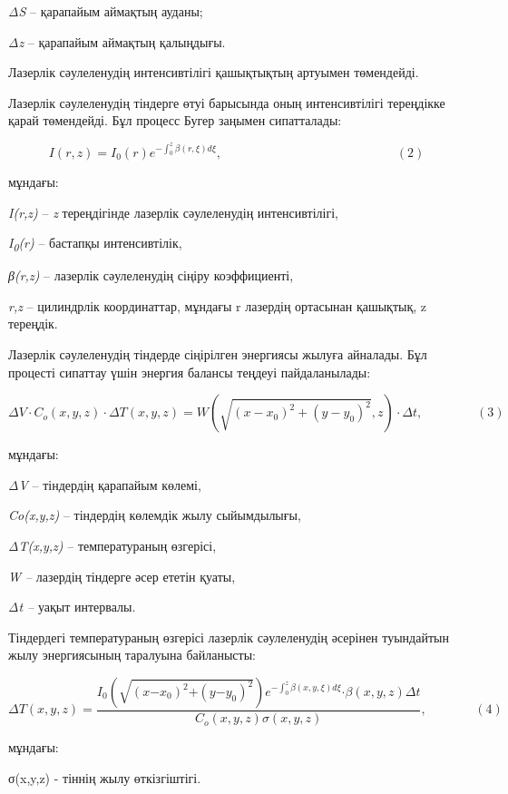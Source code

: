 \emph{ΔS} -- қарапайым аймақтың ауданы;

\emph{Δz} -- қарапайым аймақтың қалыңдығы.

Лазерлік сәулеленудің интенсивтілігі қашықтықтың артуымен төмендейді.

Лазерлік сәулеленудің тіндерге өтуі барысында оның интенсивтілігі
тереңдікке қарай төмендейді. Бұл процесс Бугер заңымен сипатталады:

\[I(r,z) = I_{0}(r)e^{- \int_{0}^{z}{\beta(r,\xi)d\xi}},\ \ \ \ \ \ \ \ \ \ \ \ \ \ \ \ \ \ \ \ \ \ \ \ \ \ \ \ \ \ \ \ \ \ \ \ \ \ \ \ \ \ \ \ \ \ \ \ \ \ \ \ \ \ \ \ \ \ \ \ \ \ (2)\]

мұндағы:

\emph{I(r,z)} -- \emph{z} тереңдігінде лазерлік сәулеленудің
интенсивтілігі,

\emph{I\textsubscript{0}(r)} -- бастапқы интенсивтілік,

\emph{β(r,z)} -- лазерлік сәулеленудің сіңіру коэффициенті,

\emph{r,z} -- цилиндрлік координаттар, мұндағы r лазердің ортасынан
қашықтық, z тереңдік.

Лазерлік сәулеленудің тіндерде сіңірілген энергиясы жылуға айналады. Бұл
процесті сипаттау үшін энергия балансы теңдеуі пайдаланылады:

\[\Delta V \cdot C_{o}(x,y,z) \cdot \Delta T(x,y,z) = W\left( \sqrt{\left( x - x_{0} \right)^{2} + \left( y - y_{0} \right)^{2}},z \right) \cdot \Delta t,\ \ \ \ \ \ \ \ \ \ \ \ \ \ \ \ \ \ \ (3)\]

мұндағы:

\emph{ΔV} -- тіндердің қарапайым көлемі,

\emph{Co(x,y,z)} -- тіндердің көлемдік жылу сыйымдылығы,

\emph{ΔT(x,y,z)} -- температураның өзгерісі,

\emph{W --} лазердің тіндерге әсер ететін қуаты,

\emph{Δt --} уақыт интервалы.

Тіндердегі температураның өзгерісі лазерлік сәулеленудің әсерінен
туындайтын жылу энергиясының таралуына байланысты:

\[\Delta T(x,y,z) = \frac{I_{0}\left( \sqrt{\left( x\mathbf{-}x_{0} \right)^{2}\mathbf{+}\left( y\mathbf{-}y_{0} \right)^{2}} \right)e^{- \int_{0}^{z}{\beta(x,y,\xi)d\xi}}\mathbf{\cdot}\beta(x,y,z)\Delta t}{C_{o}(x,y,z)\sigma(x,y,z)},\ \ \ \ \ \ \ \ \ \ \ \ \ \ \ \ \ (4)\]

мұндағы:

σ(x,y,z) - тіннің жылу өткізгіштігі.

